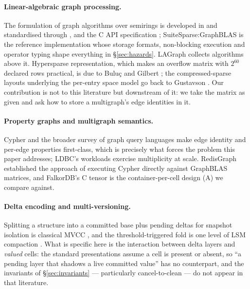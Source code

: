 \documentclass[11pt,a4paper]{article}
\theoremstyle{plain}
\theoremstyle{definition}
\theoremstyle{remark}
\begin{document}
\paragraph{Linear-algebraic graph processing.}
The formulation of graph algorithms over semirings is developed in
\cite{kepnergilbert2011} and standardised through \cite{mattson2013},
\cite{kepner2016} and the C API specification \cite{brock2021spec};
SuiteSparse:GraphBLAS \cite{davis2019toms,davis2023toms} is the reference
implementation whose storage formats, non-blocking execution and operator
typing shape everything in \S\ref{sec:hazards}. LAGraph \cite{lagraph2019}
collects algorithms above it. Hypersparse representation, which makes an
overflow matrix with $2^{60}$ declared rows practical, is due to Buluç and
Gilbert \cite{bulucgilbert2008}; the compressed-sparse layouts underlying the
per-entry space model go back to Gustavson \cite{gustavson1978}. Our
contribution is not to this literature but downstream of it: we take the
matrix as given and ask how to store a multigraph's edge identities in it.

\paragraph{Property graphs and multigraph semantics.}
Cypher \cite{francis2018cypher} and the broader survey of graph query
languages \cite{angles2017foundations} make edge identity and per-edge
properties first-class, which is precisely what forces the problem this paper
addresses; LDBC's workloads \cite{ldbc2015} exercise multiplicity at scale.
RedisGraph \cite{cailliau2019} established the approach of executing Cypher
directly against GraphBLAS matrices, and FalkorDB's C tensor is the
container-per-cell design (A) we compare against.

\paragraph{Delta encoding and multi-versioning.}
Splitting a structure into a committed base plus pending deltas for snapshot
isolation is classical MVCC \cite{bernstein1983mvcc,neumann2015mvcc}, and the
threshold-triggered fold is one level of LSM compaction \cite{oneil1996lsm}.
What is specific here is the interaction between delta layers and
\emph{valued} cells: the standard presentations assume a cell is present or
absent, so ``a pending layer that shadows a live committed value'' has no
counterpart, and the invariants of \S\ref{sec:invariants} --- particularly
cancel-to-clean --- do not appear in that literature.
\end{document}
